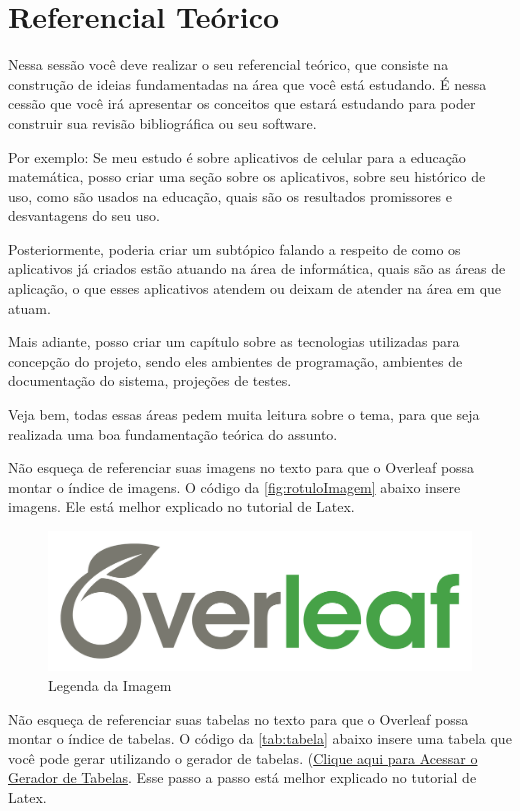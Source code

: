 \chapter{Referencial Teórico}  \label{cap:03}

Nessa sessão você deve realizar o seu referencial teórico, que consiste na construção de ideias fundamentadas na área que você está estudando.
É nessa cessão que você irá apresentar os conceitos que estará estudando para poder construir sua revisão bibliográfica ou seu software.

Por exemplo:
Se meu estudo é sobre aplicativos de celular para a educação matemática, posso criar uma seção sobre os aplicativos, sobre seu histórico de uso, como são usados na educação, quais são os resultados promissores e desvantagens do seu uso.

Posteriormente, poderia criar um subtópico falando a respeito de como os aplicativos já criados estão atuando na área de informática, quais são as áreas de aplicação, o que esses aplicativos atendem ou deixam de atender na área em que atuam.

Mais adiante, posso criar um capítulo sobre as tecnologias utilizadas para concepção do projeto, sendo eles ambientes de programação, ambientes de documentação do sistema, projeções de testes.

Veja bem, todas essas áreas pedem muita leitura sobre o tema, para que seja realizada uma boa fundamentação teórica do assunto.

Não esqueça de referenciar suas imagens no texto para que o Overleaf possa montar o índice de imagens. O código da \autoref{fig:rotuloImagem} abaixo insere imagens. Ele está melhor explicado no tutorial de Latex.\\

\begin{figure}[!h]
    \centering
    \includegraphics[width=0.7\linewidth]{imagens/exemplo.png}
    \caption{Legenda da Imagem}
    \label{fig:rotuloImagem}
\end{figure}
\newpage 

Não esqueça de referenciar suas tabelas no texto para que o Overleaf possa montar o índice de tabelas. O código da \autoref{tab:tabela} abaixo insere uma tabela que você pode gerar utilizando o gerador de tabelas. (\href{https://www.tablesgenerator.com/}{Clique aqui para Acessar o Gerador de Tabelas}. Esse passo a passo está melhor explicado no tutorial de Latex.\\

